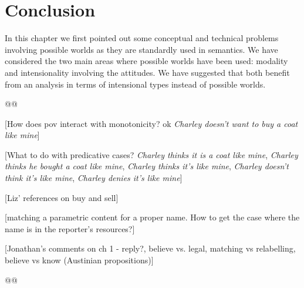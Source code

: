 \section{Conclusion}  

In this chapter we first pointed out some conceptual and technical
problems involving possible worlds as they are standardly used in semantics.
We have considered the two main areas where possible
worlds have been used: modality and intensionality involving the
attitudes.  We have suggested that both benefit from an analysis in
terms of intensional types instead of possible worlds.

@@

[How does pov interact with monotonicity?  ok \textit{Charley doesn't want
to buy a coat like mine}]

[What to do with predicative cases? \textit{Charley thinks it is a
  coat like mine}, \textit{Charley thinks he bought a coat like mine},
\textit{Charley thinks it's like mine},
\textit{Charley doesn't think it's like mine},
\textit{Charley denies it's like mine}]




[Liz' references on buy and sell] 
  
[matching a parametric content for a proper name.  How to get the case
where the name is in the reporter's resources?]  

[Jonathan's comments on ch 1 - reply?,  believe vs. legal,
matching vs relabelling, believe vs know (Austinian propositions)]

@@

